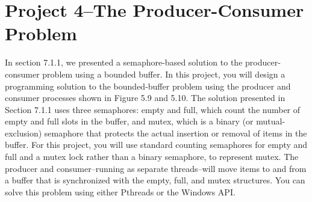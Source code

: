 \documentclass[12pt]{article}
\begin{document}
    \newpage
    \section*{Project 4--The Producer-Consumer Problem}
    
    In section 7.1.1, we presented a semaphore-based solution to the producer-consumer problem using a bounded buffer. In this project, you will design a programming solution to the bounded-buffer problem using the producer and consumer processes shown in Figure 5.9 and 5.10. The solution presented in Section 7.1.1 uses three semaphores: empty and full, which count the number of empty and full slots in the buffer, and mutex, which is a binary (or mutual-exclusion) semaphore that protects the actual insertion or removal of items in the buffer. For this project, you will use standard counting semaphores for empty and full and a mutex lock rather than a binary semaphore, to represent mutex. The producer and consumer--running as separate threads--will move items to and from a buffer that is synchronized with the empty, full, and mutex structures. You can solve this problem using either Pthreads or the Windows API.
\end{document}
